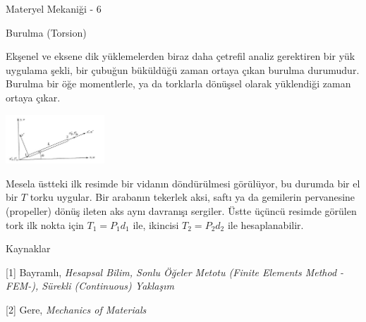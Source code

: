\documentclass[12pt,fleqn]{article}\usepackage{../../common}
\begin{document}
Materyel Mekaniği - 6

Burulma (Torsion)

Ekşenel ve eksene dik yüklemelerden biraz daha çetrefil analiz gerektiren bir
yük uygulama şekli, bir çubuğun büküldüğü zaman ortaya çıkan burulma durumudur.
Burulma bir öğe momentlerle, ya da torklarla dönüşsel olarak yüklendiği zaman
ortaya çıkar. 

\includegraphics[width=10em]{phy_020_strs_06_01.jpg}

Mesela üstteki ilk resimde bir vidanın döndürülmesi görülüyor, bu durumda bir el
bir $T$ torku uygular. Bir arabanın tekerlek aksi, saftı ya da gemilerin
pervanesine (propeller) dönüş ileten aks aynı davranışı sergiler.  Üstte üçüncü
resimde görülen tork ilk nokta için $T_1 = P_1 d_1$ ile, ikincisi $T_2 = P_2
d_2$ ile hesaplanabilir.

Kaynaklar

[1] Bayramlı, {\em Hesapsal Bilim, Sonlu Öğeler Metotu (Finite Elements Method -FEM-), Sürekli (Continuous) Yaklaşım}

[2] Gere, {\em Mechanics of Materials}
\end{document}
